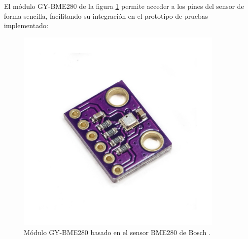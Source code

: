 \begin{table}[H]
    \centering
    \caption{Especificaciones del sensor BME280 de Bosch.}
    \label{tab:specsBME280}
    \end{table}

El módulo GY-BME280 de la figura \ref{fig:bme280} permite acceder a los pines del sensor de forma sencilla, facilitando su integración en el prototipo de pruebas implementado:

\begin{figure}[H]
    \centering
    \includegraphics[width = 0.9\textwidth]{imagenes/cap2_marcometod/BME280BREAKOUT.jpeg}
    \caption{Módulo GY-BME280 basado en el sensor BME280 de Bosch \citep{bme280}.}
    \label{fig:bme280}
\end{figure}

